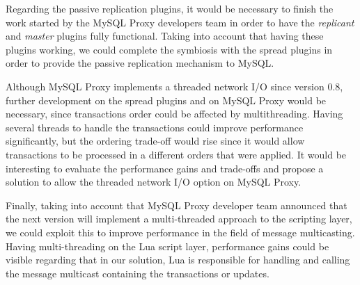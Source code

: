 Regarding the passive replication plugins, it would be necessary to finish the work started by the MySQL Proxy developers team in order to have the \textit{replicant} and \textit{master} plugins fully functional. Taking into account that having these plugins working, we could complete the symbiosis with the spread plugins in order to provide the passive replication mechanism to MySQL.

Although MySQL Proxy implements a threaded network I/O since version 0.8, further development on the spread plugins and on MySQL Proxy would be necessary, since transactions order could be affected by multithreading. Having several threads to handle the transactions could improve performance significantly, but the ordering trade-off would rise since it would allow transactions to be processed in a different orders that were applied. It would be interesting to evaluate the performance gains and trade-offs and propose a solution to allow the threaded network I/O option on MySQL Proxy.  

Finally, taking into account that MySQL Proxy developer team announced that the next version will implement a multi-threaded approach to the scripting layer, we could exploit this to improve performance in the field of message multicasting. Having multi-threading on the Lua script layer, performance gains could be visible regarding that in our solution, Lua is responsible for handling and calling the message multicast containing the transactions or updates.

